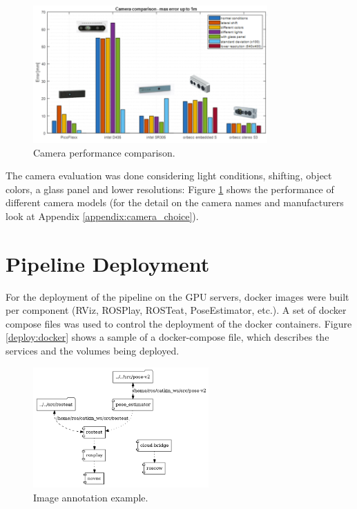     \begin{figure}[h]
        \centering
        \includegraphics[width=0.8\textwidth]{images/camera_choice.png}
        \caption{Camera performance comparison.}
        \label{fig:camera_choice}
    \end{figure}
    
    The camera evaluation was done considering light conditions, shifting, object colors, a glass panel and lower resolutions: Figure \ref{fig:camera_choice} shows the performance of different camera models (for the detail on the camera names and manufacturers look at Appendix \ref{appendix:camera_choice}).
\section{Pipeline Deployment}
For the deployment of the pipeline on the GPU servers, docker images were built per component (RViz, ROSPlay, ROSTeat, PoseEstimator, etc.). A set of docker compose files was used to control the deployment of the docker containers. Figure \ref{deploy:docker} shows a sample of a docker-compose file, which describes the services and the volumes being deployed.

\begin{figure}[h]
    \centering
    \includegraphics[width=0.6\textwidth]{images/cow_docker_topology.png}
    \caption{Image annotation example.}
    \label{fig:cow_docker_topology}
\end{figure}
\lipsum[2-3]

